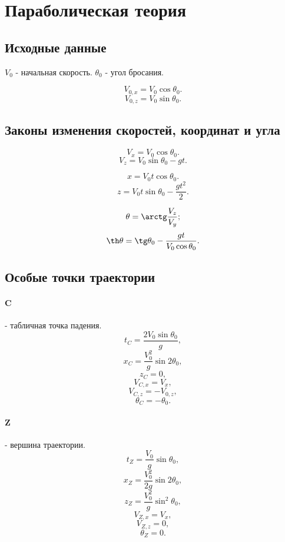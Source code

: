 \section{Параболическая теория}

\subsection{Исходные данные}
$V_0$ - начальная скорость.
$\theta_0$ - угол бросания.

$$V_{0,x} = V_0 \cos\theta_0.$$
$$V_{0,z} = V_0 \sin\theta_0.$$

\subsection{Законы изменения скоростей, координат и угла}
$$V_x = V_0 \cos\theta_0.$$
$$V_z = V_0 \sin\theta_0 - gt.$$

$$x = V_0t\cos\theta_0.$$
$$z = V_0t\sin\theta_0 - \frac{gt^2}{2}.$$

$$\theta = \arctg\frac{V_z}{V_y};$$
$$\th\theta = \tg\theta_0 - \frac{gt}{V_0 \cos\theta_0}.$$

\subsection{Особые точки траектории}
\paragraph{C} - табличная точка падения.
$$t_C = \frac{2V_0\sin\theta_0}{g},$$
$$x_C = \frac{V_0^2}{g}\sin2\theta_0,$$
$$z_C = 0,$$
$$V_{C,x} = V_x,$$
$$V_{C,z} = - V_{0,z},$$
$$\theta_C = - \theta_0.$$

\paragraph{Z} - вершина траектории.
$$t_Z = \frac{V_0}{g}\sin\theta_0,$$
$$x_Z = \frac{V_0^2}{2g}\sin2\theta_0,$$
$$z_Z = \frac{V_0^2}{g}\sin^2\theta_0,$$
$$V_{Z,x} = V_x,$$
$$V_{Z,z} = 0,$$
$$\theta_Z = 0.$$
